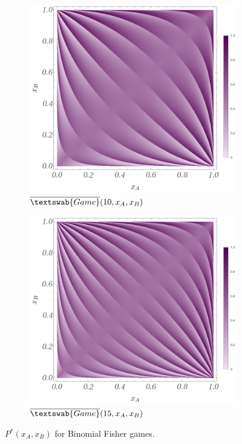 \documentclass{article}
\theoremstyle{definition}
\newcommand{\InfG}[1]{$\overline{\textswab{Game}}(#1)$}
\begin{document}
\begin{figure}[H]
    \centering
    \begin{subfigure}[b]{0.4\textwidth}
        \includegraphics[width=\textwidth]{img/BinomialFisher_10.png}
        \caption{\InfG{10,x_A,x_B}}
        \label{fig:PG_10}
    \end{subfigure}
    \hspace{0.05\textwidth} %
    \begin{subfigure}[b]{0.4\textwidth}
        \includegraphics[width=\textwidth]{img/BinomialFisher_15.png}
        \caption{\InfG{15,x_A,x_B}}
        \label{fig:PG_15}
    \end{subfigure}
    
    \caption{$P^*(x_A,x_B)$ for Binomial Fisher games.}
    \label{fig:P_InfG_10_15}
\end{figure}
\end{document}
